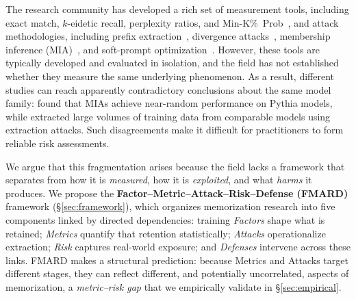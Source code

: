 \documentclass[11pt]{article}
\begin{document}
The research community has developed a rich set of measurement tools, including
exact match, $k$-eidetic recall, perplexity ratios, and
Min-K\%~Prob~\citep{shi2023detecting}, and attack methodologies, including
prefix extraction~\citep{carlini2021extractingtrainingdatalarge}, divergence
attacks~\citep{nasr2023scalableextractiontrainingdata}, membership inference
(MIA)~\citep{shokri2017membership}, and soft-prompt
optimization~\citep{ozdayi2023controllingextractionmemorizeddata}.
However, these tools are typically developed and evaluated in isolation, and
the field has not established whether they measure the same underlying
phenomenon.
As a result, different studies can reach apparently contradictory conclusions
about the same model family: \citet{duan2024membership} found that MIAs
achieve near-random performance on Pythia models, while
\citet{nasr2023scalableextractiontrainingdata} extracted large volumes of
training data from comparable models using extraction attacks.
Such disagreements make it difficult for practitioners to form reliable risk
assessments.

We argue that this fragmentation arises because the field lacks a framework
that separates
from how it is
\textit{measured}, how it is \textit{exploited}, and what \textit{harms} it
produces.
We propose the \textbf{Factor--Metric--Attack--Risk--Defense (FMARD)}
framework (\S\ref{sec:framework}), which organizes memorization research into
five components linked by directed dependencies: training \textit{Factors}
shape what is retained; \textit{Metrics} quantify that retention
statistically; \textit{Attacks} operationalize extraction; \textit{Risk}
captures real-world exposure; and \textit{Defenses} intervene across these
links.
FMARD makes a structural prediction: because Metrics and Attacks target
different stages, they can reflect different, and potentially uncorrelated,
aspects of memorization, a \textit{metric--risk gap} that we empirically
validate in \S\ref{sec:empirical}.
\end{document}
